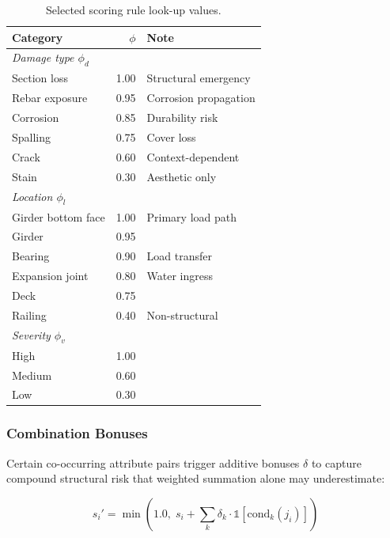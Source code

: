 \documentclass[twocolumn]{article}
\begin{document}
\begin{table}[h]
\centering
\caption{Selected scoring rule look-up values.}
\label{tab:scoring_rules}
\begin{tabular}{lrl}
\toprule
\textbf{Category} & $\phi$ & \textbf{Note} \\
\midrule
\multicolumn{3}{l}{\textit{Damage type $\phi_d$}} \\
Section loss       & 1.00 & Structural emergency \\
Rebar exposure     & 0.95 & Corrosion propagation \\
Corrosion          & 0.85 & Durability risk \\
Spalling           & 0.75 & Cover loss \\
Crack              & 0.60 & Context-dependent \\
Stain              & 0.30 & Aesthetic only \\
\midrule
\multicolumn{3}{l}{\textit{Location $\phi_l$}} \\
Girder bottom face & 1.00 & Primary load path \\
Girder             & 0.95 & \\
Bearing            & 0.90 & Load transfer \\
Expansion joint    & 0.80 & Water ingress \\
Deck               & 0.75 & \\
Railing            & 0.40 & Non-structural \\
\midrule
\multicolumn{3}{l}{\textit{Severity $\phi_v$}} \\
High               & 1.00 & \\
Medium             & 0.60 & \\
Low                & 0.30 & \\
\bottomrule
\end{tabular}
\end{table}

\subsubsection{Combination Bonuses}

Certain co-occurring attribute pairs trigger additive bonuses $\delta$ to
capture compound structural risk that weighted summation alone may underestimate:

\begin{equation}
  s_i' = \min\!\left(1.0,\; s_i + \sum_k \delta_k \cdot \mathbb{1}[\text{cond}_k(j_i)]\right)
  \label{eq:bonus}
\end{equation}
\end{document}
